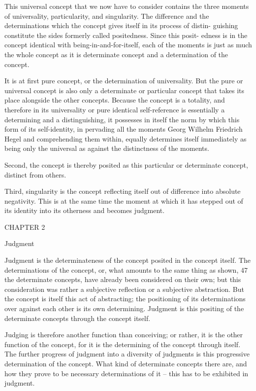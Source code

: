 This universal concept that we now have to consider contains the three
moments of universality, particularity, and singularity. The difference and
the determinations which the concept gives itself in its process of distin-
guishing constitute the sides formerly called positedness. Since this posit-
edness is in the concept identical with being-in-and-for-itself, each of the
moments is just as much the whole concept as it is determinate concept and
a determination of the concept.

It is at first pure concept, or the determination of universality. But the
pure or universal concept is also only a determinate or particular concept
that takes its place alongside the other concepts. Because the concept is
a totality, and therefore in its universality or pure identical self-reference
is essentially a determining and a distinguishing, it possesses in itself the
norm by which this form of its self-identity, in pervading all the moments
Georg Wilhelm Friedrich Hegel
and comprehending them within, equally determines itself immediately as
being only the universal as against the distinctness of the moments.

Second, the concept is thereby posited as this particular or determinate
concept, distinct from others.

Third, singularity is the concept reflecting itself out of difference into
absolute negativity. This is at the same time the moment at which it has
stepped out of its identity into its otherness and becomes judgment.

CHAPTER 2

Judgment

Judgment is the determinateness of the concept posited in the concept itself.
The determinations of the concept, or, what amounts to the same thing
as shown, 47 the determinate concepts, have already been considered on
their own; but this consideration was rather a subjective reflection or a
subjective abstraction. But the concept is itself this act of abstracting;
the positioning of its determinations over against each other is its own
determining. Judgment is this positing of the determinate concepts through
the concept itself.

Judging is therefore another function than conceiving; or rather, it is the
other function of the concept, for it is the determining of the concept through
itself. The further progress of judgment into a diversity of judgments is
this progressive determination of the concept. What kind of determinate
concepts there are, and how they prove to be necessary determinations of
it – this has to be exhibited in judgment.

